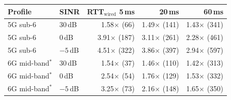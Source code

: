 \begin{tabular}{@{}llrrr@{}}
\toprule
Profile & SINR & RTT$_\text{wired}$ 5\,ms & 20\,ms & 60\,ms \\
\midrule
5G sub-6 & $30$\,dB & 1.58$\times$ (66) & 1.49$\times$ (141) & 1.43$\times$ (341) \\
5G sub-6 & $0$\,dB & 3.91$\times$ (187) & 3.11$\times$ (261) & 2.28$\times$ (461) \\
5G sub-6 & $-5$\,dB & 4.51$\times$ (322) & 3.86$\times$ (397) & 2.94$\times$ (597) \\
\midrule
6G mid-band$^\ast$ & $30$\,dB & 1.54$\times$ (37) & 1.46$\times$ (110) & 1.42$\times$ (313) \\
6G mid-band$^\ast$ & $0$\,dB & 2.54$\times$ (54) & 1.76$\times$ (129) & 1.53$\times$ (332) \\
6G mid-band$^\ast$ & $-5$\,dB & 3.25$\times$ (73) & 2.16$\times$ (148) & 1.65$\times$ (350) \\
\bottomrule
\end{tabular}
